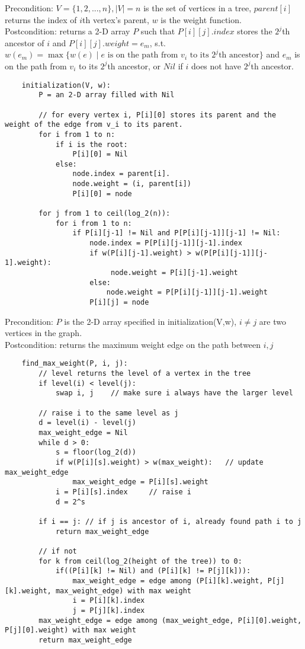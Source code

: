 \documentclass[11pt]{article}
\begin{document}
Precondition: $V=\{1,2,...,n\}, |V|=n$ is the set of vertices in a tree, $parent[i]$ returns the index of $i$th vertex's parent, $w$ is the weight function.\\
Postcondition: returns a 2-D array $P$ such that $P[i][j].index$ stores the $2^j$th ancestor of $i$ and $P[i][j].weight = e_m$, s.t. $w(e_m) = \max\{w(e)\mid e \text{ is on the path from }v_i \text{ to its }2^j\text{th ancestor}\}$ and $e_m$ is on the path from $v_i$ to its $2^j$th ancestor, or $Nil$ if $i$ does not have $2^j$th ancestor. \\
\begin{lstlisting}
    initialization(V, w):
        P = an 2-D array filled with Nil
        
        // for every vertex i, P[i][0] stores its parent and the weight of the edge from v_i to its parent. 
        for i from 1 to n:
            if i is the root:
                P[i][0] = Nil
            else:
                node.index = parent[i].
                node.weight = (i, parent[i])
                P[i][0] = node
        
        for j from 1 to ceil(log_2(n)):
            for i from 1 to n:
                if P[i][j-1] != Nil and P[P[i][j-1]][j-1] != Nil:
                    node.index = P[P[i][j-1]][j-1].index
                    if w(P[i][j-1].weight) > w(P[P[i][j-1]][j-1].weight):
                         node.weight = P[i][j-1].weight
                    else:
                        node.weight = P[P[i][j-1]][j-1].weight
                    P[i][j] = node
\end{lstlisting}
\vspace{1cm}
Precondition: $P$ is the 2-D array specified in initialization(V,w), $i\neq j$ are two vertices in the graph. \\
Postcondition: returns the maximum weight edge on the path between $i, j$
\begin{lstlisting}
    find_max_weight(P, i, j):
        // level returns the level of a vertex in the tree
        if level(i) < level(j):
            swap i, j    // make sure i always have the larger level
            
        // raise i to the same level as j
        d = level(i) - level(j)
        max_weight_edge = Nil
        while d > 0:
            s = floor(log_2(d)) 
            if w(P[i][s].weight) > w(max_weight):   // update max_weight_edge
                max_weight_edge = P[i][s].weight
            i = P[i][s].index     // raise i
            d = 2^s
          
        if i == j: // if j is ancestor of i, already found path i to j
            return max_weight_edge
            
        // if not 
        for k from ceil(log_2(height of the tree)) to 0:
            if((P[i][k] != Nil) and (P[i][k] != P[j][k])):
                max_weight_edge = edge among (P[i][k].weight, P[j][k].weight, max_weight_edge) with max weight
                i = P[i][k].index
                j = P[j][k].index
        max_weight_edge = edge among (max_weight_edge, P[i][0].weight, P[j][0].weight) with max weight
        return max_weight_edge
\end{lstlisting}
\end{document}
